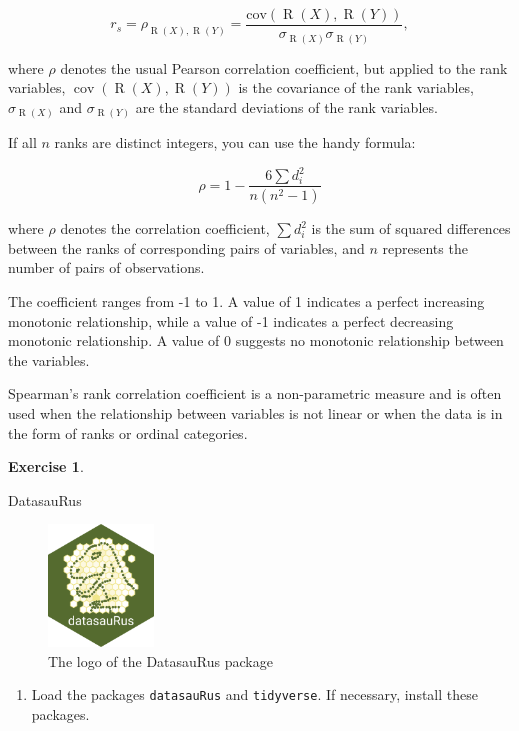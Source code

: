 \documentclass[
  12pt,
  oneside]{book}
\providecommand{\tightlist}{%
  \setlength{\itemsep}{0pt}\setlength{\parskip}{0pt}}
\theoremstyle{definition}
\theoremstyle{definition}
\theoremstyle{definition}
\newtheorem{exercise}{Exercise}[chapter]
\theoremstyle{definition}
\theoremstyle{remark}
\begin{document}
\[
r_s = \rho_{\operatorname{R}(X),\operatorname{R}(Y)} = \frac{\text{cov}(\operatorname{R}(X), \operatorname{R}(Y))}{\sigma_{\operatorname{R}(X)} \sigma_{\operatorname{R}(Y)}},
\]

where
\(\rho\) denotes the usual Pearson correlation coefficient, but applied to the rank variables,
\(\operatorname{cov}(\operatorname{R}(X), \operatorname{R}(Y))\) is the covariance of the rank variables,
\(\sigma_{\operatorname{R}(X)}\) and \(\sigma_{\operatorname{R}(Y)}\) are the standard deviations of the rank variables.

If all \(n\) ranks are distinct integers, you can use the handy formula:

\[
\rho = 1 - \frac{6\sum d_i^2}{n(n^2 - 1)}
\]

where \(\rho\) denotes the correlation coefficient, \(\sum d_i^2\) is the sum of squared differences between the ranks of corresponding pairs of variables, and \(n\) represents the number of pairs of observations.

The coefficient ranges from -1 to 1. A value of 1 indicates a perfect increasing monotonic relationship, while a value of -1 indicates a perfect decreasing monotonic relationship. A value of 0 suggests no monotonic relationship between the variables.

Spearman's rank correlation coefficient is a non-parametric measure and is often used when the relationship between variables is not linear or when the data is in the form of ranks or ordinal categories.

\begin{exercise}
\protect\hypertarget{exr:DatasauRus}{}\label{exr:DatasauRus}

DatasauRus

\begin{figure}
\centering
\includegraphics[width=0.25\textwidth,height=\textheight]{fig/datasaurus.png}
\caption[\label{fig:datasaurus} The logo of the DatasauRus package]{\label{fig:datasaurus} The logo of the DatasauRus package\footnotemark{}}
\end{figure}

\begin{enumerate}
\def\labelenumi{\alph{enumi})}
\tightlist
\item
  Load the packages \texttt{datasauRus} and \texttt{tidyverse}. If necessary, install these packages.
\end{enumerate}

\end{exercise}
\end{document}
